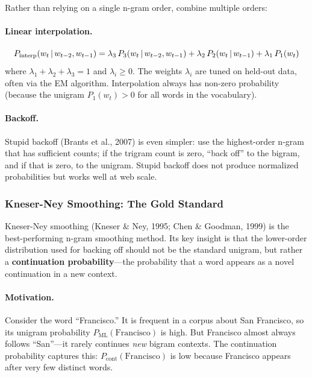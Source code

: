 Rather than relying on a single n-gram order, combine multiple orders:

\paragraph{Linear interpolation.}
\begin{equation}
P_{\text{interp}}(w_t \,|\, w_{t-2}, w_{t-1})
= \lambda_3\, P_3(w_t \,|\, w_{t-2}, w_{t-1})
+ \lambda_2\, P_2(w_t \,|\, w_{t-1})
+ \lambda_1\, P_1(w_t)
\label{eq:interpolation}
\end{equation}
where $\lambda_1 + \lambda_2 + \lambda_3 = 1$ and $\lambda_i \geq 0$.  The
weights $\lambda_i$ are tuned on held-out data, often via the EM algorithm.
Interpolation always has non-zero probability (because the unigram $P_1(w_t) > 0$
for all words in the vocabulary).

\paragraph{Backoff.}
Stupid backoff (Brants et al., 2007) is even simpler: use the highest-order
n-gram that has sufficient counts; if the trigram count is zero, ``back off''
to the bigram, and if that is zero, to the unigram.  Stupid backoff does not
produce normalized probabilities but works well at web scale.

\subsubsection{Kneser-Ney Smoothing: The Gold Standard}

Kneser-Ney smoothing (Kneser \& Ney, 1995; Chen \& Goodman, 1999) is the
best-performing n-gram smoothing method.  Its key insight is that the
lower-order distribution used for backing off should not be the standard
unigram, but rather a \textbf{continuation probability}---the probability
that a word appears as a novel continuation in a new context.

\paragraph{Motivation.}
Consider the word ``Francisco.''  It is frequent in a corpus about San
Francisco, so its unigram probability $P_{\text{ML}}(\text{Francisco})$ is
high.  But Francisco almost always follows ``San''---it rarely continues
\emph{new} bigram contexts.  The continuation probability captures this:
$P_{\text{cont}}(\text{Francisco})$ is low because Francisco appears after
very few distinct words.

